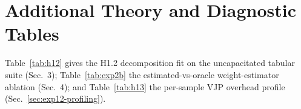 \documentclass{article}
\theoremstyle{plain}
\begin{document}






\section{Additional Theory and Diagnostic Tables}
\label{app:tables}

Table~\ref{tab:h12} gives the H1.2 decomposition fit on the uncapacitated tabular
suite (Sec.~3); Table~\ref{tab:exp2b} the estimated-vs-oracle weight-estimator
ablation (Sec.~4); and Table~\ref{tab:h13} the per-sample VJP overhead profile
(Sec.~\ref{sec:exp12-profiling}).




\end{document}
